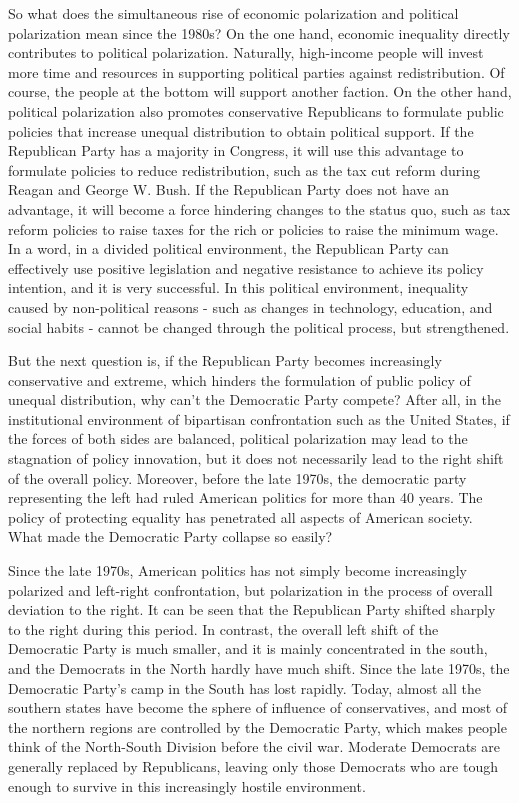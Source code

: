 \documentclass[11pt]{article}
\begin{document}
So what does the simultaneous rise of economic polarization and political polarization mean since the 1980s? On the one hand, economic inequality directly contributes to political polarization. Naturally, high-income people will invest more time and resources in supporting political parties against redistribution. Of course, the people at the bottom will support another faction. On the other hand, political polarization also promotes conservative Republicans to formulate public policies that increase unequal distribution to obtain political support. If the Republican Party has a majority in Congress, it will use this advantage to formulate policies to reduce redistribution, such as the tax cut reform during Reagan and George W. Bush. If the Republican Party does not have an advantage, it will become a force hindering changes to the status quo, such as tax reform policies to raise taxes for the rich or policies to raise the minimum wage. In a word, in a divided political environment, the Republican Party can effectively use positive legislation and negative resistance to achieve its policy intention, and it is very successful. In this political environment, inequality caused by non-political reasons - such as changes in technology, education, and social habits - cannot be changed through the political process, but strengthened.

But the next question is, if the Republican Party becomes increasingly conservative and extreme, which hinders the formulation of public policy of unequal distribution, why can't the Democratic Party compete? After all, in the institutional environment of bipartisan confrontation such as the United States, if the forces of both sides are balanced, political polarization may lead to the stagnation of policy innovation, but it does not necessarily lead to the right shift of the overall policy. Moreover, before the late 1970s, the democratic party representing the left had ruled American politics for more than 40 years. The policy of protecting equality has penetrated all aspects of American society. What made the Democratic Party collapse so easily?

Since the late 1970s, American politics has not simply become increasingly polarized and left-right confrontation, but polarization in the process of overall deviation to the right. It can be seen that the Republican Party shifted sharply to the right during this period. In contrast, the overall left shift of the Democratic Party is much smaller, and it is mainly concentrated in the south, and the Democrats in the North hardly have much shift. Since the late 1970s, the Democratic Party's camp in the South has lost rapidly. Today, almost all the southern states have become the sphere of influence of conservatives, and most of the northern regions are controlled by the Democratic Party, which makes people think of the North-South Division before the civil war. Moderate Democrats are generally replaced by Republicans, leaving only those Democrats who are tough enough to survive in this increasingly hostile environment.
\end{document}
